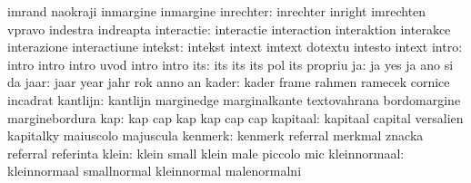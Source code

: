                            imrand                    naokraji
                           inmargine                 inmargine
                inrechter: inrechter                 inright
                           imrechten                 vpravo
                           indestra                  indreapta
               interactie: interactie                interaction
                           interaktion               interakce
                           interazione               interactiune
                  intekst: intekst                   intext
                           imtext                    dotextu
                           intesto                   intext
                    intro: intro                     intro
                           intro                     uvod
                           intro                     intro
                      its: its                       its
                           its                       pol
                           its                       propriu %
                       ja: ja                        yes
                           ja                        ano
                           si                        da
                     jaar: jaar                      year
                           jahr                      rok
                           anno                      an
                    kader: kader                     frame
                           rahmen                    ramecek
                           cornice                   incadrat
                 kantlijn: kantlijn                  marginedge
                           marginalkante             textovahrana
                           bordomargine              marginebordura
                      kap: kap                       cap
                           kap                       kap
                           cap                       cap
                 kapitaal: kapitaal                  capital
                           versalien                 kapitalky
                           maiuscolo                 majuscula
                  kenmerk: kenmerk                   referral
                           merkmal                   znacka
                           referral                  referinta
                    klein: klein                     small
                           klein                     male
                           piccolo                   mic
             kleinnormaal: kleinnormaal              smallnormal
                           kleinnormal               malenormalni
